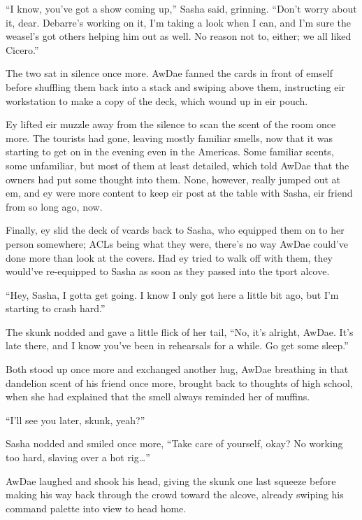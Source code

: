 ``I know, you've got a show coming up,'' Sasha said, grinning. ``Don't worry about it, dear. Debarre's working on it, I'm taking a look when I can, and I'm sure the weasel's got others helping him out as well. No reason not to, either; we all liked Cicero.''

The two sat in silence once more. AwDae fanned the cards in front of emself before shuffling them back into a stack and swiping above them, instructing eir workstation to make a copy of the deck, which wound up in eir pouch.

Ey lifted eir muzzle away from the silence to scan the scent of the room once more. The tourists had gone, leaving mostly familiar smells, now that it was starting to get on in the evening even in the Americas. Some familiar scents, some unfamiliar, but most of them at least detailed, which told AwDae that the owners had put some thought into them. None, however, really jumped out at em, and ey were more content to keep eir post at the table with Sasha, eir friend from so long ago, now.

Finally, ey slid the deck of vcards back to Sasha, who equipped them on to her person somewhere; ACLs being what they were, there's no way AwDae could've done more than look at the covers. Had ey tried to walk off with them, they would've re-equipped to Sasha as soon as they passed into the tport alcove.

``Hey, Sasha, I gotta get going. I know I only got here a little bit ago, but I'm starting to crash hard.''

The skunk nodded and gave a little flick of her tail, ``No, it's alright, AwDae. It's late there, and I know you've been in rehearsals for a while. Go get some sleep.''

Both stood up once more and exchanged another hug, AwDae breathing in that dandelion scent of his friend once more, brought back to thoughts of high school, when she had explained that the smell always reminded her of muffins.

``I'll see you later, skunk, yeah?''

Sasha nodded and smiled once more, ``Take care of yourself, okay? No working too hard, slaving over a hot rig\ldots{}''

AwDae laughed and shook his head, giving the skunk one last squeeze before making his way back through the crowd toward the alcove, already swiping his command palette into view to head home.
